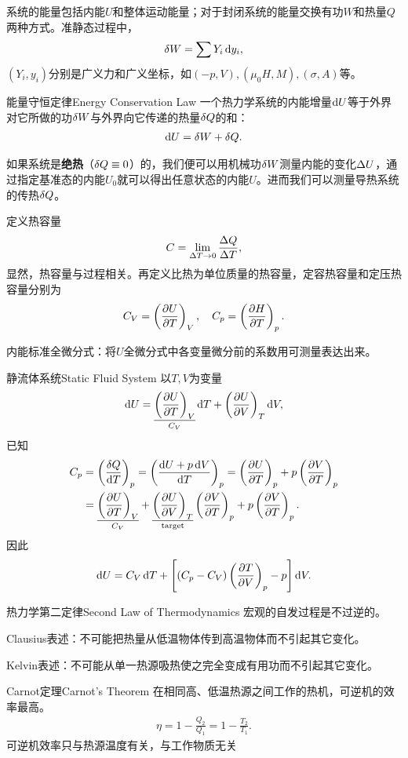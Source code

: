 系统的能量包括内能$U$和整体运动能量；对于封闭系统的能量交换有功$W$和热量$Q$两种方式。准静态过程中，
\begin{align}
	\mathop{}\!\delta W=\sum Y_i\mathop{}\!\mathrm{d} y_i,
\end{align}
$(Y_i,y_i)$分别是广义力和广义坐标，如$(-p,V),(\mu_0H,M),(\sigma,A)$等。
\begin{theorem}{能量守恒定律}{Energy Conservation Law}
	一个热力学系统的内能增量$\mathop{}\!\mathrm{d} U$等于外界对它所做的功$\mathop{}\!\delta W$与外界向它传递的热量$\mathop{}\!\delta Q$的和：
	\begin{align}
		\mathop{}\!\mathrm{d} U=\mathop{}\!\delta W+\mathop{}\!\delta Q.
	\end{align}
\end{theorem}
\indent 如果系统是\textbf{绝热}（$\mathop{}\!\delta Q\equiv 0$）的，我们便可以用机械功$\mathop{}\!\delta W$测量内能的变化$\Delta U$，通过指定基准态的内能$U_0$就可以得出任意状态的内能$U$。进而我们可以测量导热系统的传热$\mathop{}\!\delta Q$。

定义热容量
\[C=\lim_{\Delta T\to0}\frac{\Delta Q}{\Delta T},\]
显然，热容量与过程相关。再定义比热为单位质量的热容量，定容热容量和定压热容量分别为
\begin{align}
	C_V=\kh{\pv UT}_V,\quad C_p=\kh{\pv HT}_p.
\end{align}

内能标准全微分式：将$U$全微分式中各变量微分前的系数用可测量表达出来。
\begin{example}{静流体系统}{Static Fluid System}
	以$T,V$为变量
	\[\d U=\underset{C_V}{\underline{\kh{\pv UT}_V}}\d T+\kh{\pv UV}_T\d V,\]
	已知 
	\begin{align*}
		C_p&=\kh{\frac{\vd Q}{\d T}}_p=\kh{\frac{\d U+p\d V}{\d T}}_p=\kh{\pv UT}_p+p\kh{\pv VT}_p\\
		&=\underset{C_V}{\underline{\kh{\pv UT}_V}}+\underset{\text{target}}{\underline{\kh{\pv UV}_T}}\kh{\pv VT}_p+p\kh{\pv VT}_p.
	\end{align*}
	因此
	\begin{align}
		\mathop{}\!\mathrm{d} U=C_V\mathop{}\!\mathrm{d} T+\left[(C_p-C_V)\left(\frac{\partial^{\;\!\!}T}{\partial V^{\;\!\!}}\right)_p-p\right]\mathop{}\!\mathrm{d} V.
	\end{align}
\end{example}
\begin{theorem}{热力学第二定律}{Second Law of Thermodynamics}
	宏观的自发过程是不过逆的。

	Clausius表述：不可能把热量从低温物体传到高温物体而不引起其它变化。

	Kelvin表述：不可能从单一热源吸热使之完全变成有用功而不引起其它变化。
\end{theorem}
\begin{theorem}{Carnot定理}{Carnot's Theorem}
	在相同高、低温热源之间工作的热机，可逆机的效率最高。
	\begin{align}
		\eta=1-\frac{Q_2}{Q_1}=1-\frac{T_2}{T_1}.
	\end{align}
	可逆机效率只与热源温度有关，与工作物质无关
\end{theorem}
